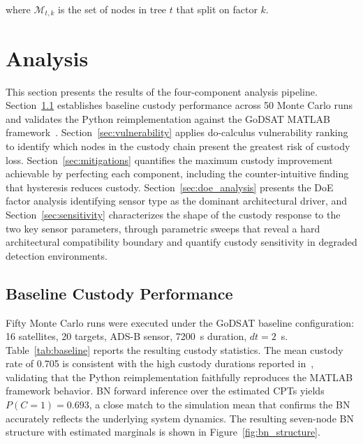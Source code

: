 \documentclass[]{spie}
\begin{document}
where $\mathcal{M}_{t,k}$ is the set of nodes in tree $t$ that split on factor $k$.

\section{Analysis}
\label{sec:analysis}

This section presents the results of the four-component analysis pipeline. 
Section~\ref{sec:baseline} establishes baseline custody performance across 50 Monte Carlo runs and validates the Python reimplementation against the GoDSAT MATLAB framework~\cite{Saeed2026GoDSATRL}. Section~\ref{sec:vulnerability} applies do-calculus vulnerability ranking to identify which nodes in the custody chain present the 
greatest risk of custody loss. Section~\ref{sec:mitigations} quantifies the maximum custody improvement achievable by perfecting each component, including the counter-intuitive finding that hysteresis reduces custody. Section~\ref{sec:doe_analysis} presents the DoE factor analysis identifying sensor type as the dominant architectural 
driver, and Section~\ref{sec:sensitivity} characterizes the shape of the custody 
response to the two key sensor parameters, through parametric sweeps that reveal a hard 
architectural compatibility boundary and quantify custody sensitivity in degraded detection environments.

\subsection{Baseline Custody Performance}
\label{sec:baseline}

Fifty Monte Carlo runs were executed under the GoDSAT baseline configuration: 16 satellites, 20 targets, ADS-B sensor, 7200~s duration, $dt = 2$~s. Table~\ref{tab:baseline} reports the resulting custody statistics. The mean custody rate of 0.705 is consistent with the high custody durations reported in~\cite{Saeed2026GoDSATRL}, validating that the Python reimplementation faithfully reproduces the MATLAB framework behavior. BN forward inference over the estimated CPTs yields $P(C{=}1) = 0.693$, a close match to the simulation mean that confirms the BN accurately reflects the underlying system dynamics. The resulting seven-node BN structure with estimated marginals is shown in Figure~\ref{fig:bn_structure}.
\end{document}
